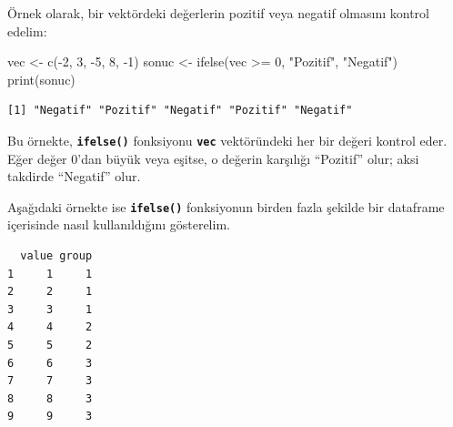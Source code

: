 \documentclass[
  letterpaper,
  DIV=11,
  numbers=noendperiod]{scrreprt}
\newenvironment{Shaded}{\begin{snugshade}}{\end{snugshade}}
\newcommand{\AttributeTok}[1]{\textcolor[rgb]{0.40,0.45,0.13}{#1}}
\newcommand{\DecValTok}[1]{\textcolor[rgb]{0.68,0.00,0.00}{#1}}
\newcommand{\FunctionTok}[1]{\textcolor[rgb]{0.28,0.35,0.67}{#1}}
\newcommand{\NormalTok}[1]{\textcolor[rgb]{0.00,0.23,0.31}{#1}}
\newcommand{\OtherTok}[1]{\textcolor[rgb]{0.00,0.23,0.31}{#1}}
\newcommand{\SpecialCharTok}[1]{\textcolor[rgb]{0.37,0.37,0.37}{#1}}
\newcommand{\StringTok}[1]{\textcolor[rgb]{0.13,0.47,0.30}{#1}}
\begin{document}
Örnek olarak, bir vektördeki değerlerin pozitif veya negatif olmasını
kontrol edelim:

\begin{Shaded}
\begin{Highlighting}[]
\NormalTok{vec }\OtherTok{\textless{}{-}} \FunctionTok{c}\NormalTok{(}\SpecialCharTok{{-}}\DecValTok{2}\NormalTok{, }\DecValTok{3}\NormalTok{, }\SpecialCharTok{{-}}\DecValTok{5}\NormalTok{, }\DecValTok{8}\NormalTok{, }\SpecialCharTok{{-}}\DecValTok{1}\NormalTok{)}
\NormalTok{sonuc }\OtherTok{\textless{}{-}} \FunctionTok{ifelse}\NormalTok{(vec }\SpecialCharTok{\textgreater{}=} \DecValTok{0}\NormalTok{, }\StringTok{"Pozitif"}\NormalTok{, }\StringTok{"Negatif"}\NormalTok{)}
\FunctionTok{print}\NormalTok{(sonuc)}
\end{Highlighting}
\end{Shaded}

\begin{verbatim}
[1] "Negatif" "Pozitif" "Negatif" "Pozitif" "Negatif"
\end{verbatim}

Bu örnekte, \textbf{\texttt{ifelse()}} fonksiyonu \textbf{\texttt{vec}}
vektöründeki her bir değeri kontrol eder. Eğer değer 0'dan büyük veya
eşitse, o değerin karşılığı ``Pozitif'' olur; aksi takdirde ``Negatif''
olur.

Aşağıdaki örnekte ise \textbf{\texttt{ifelse()}} fonksiyonun birden
fazla şekilde bir dataframe içerisinde nasıl kullanıldığını gösterelim.

\begin{Shaded}
\end{Shaded}

\begin{verbatim}
  value group
1     1     1
2     2     1
3     3     1
4     4     2
5     5     2
6     6     3
7     7     3
8     8     3
9     9     3
\end{verbatim}
\end{document}
